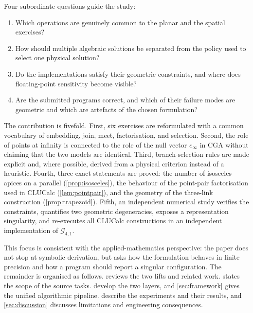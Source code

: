 \documentclass[11pt,a4paper]{article}
\theoremstyle{plain}
\theoremstyle{definition}
\theoremstyle{remark}
\newcommand{\GA}{\mathcal{G}_{4,1}}
\newcommand{\einf}{e_{\infty}}
\begin{document}
Four subordinate questions guide the study:
\begin{enumerate}[label=\textbf{RQ\arabic*.},leftmargin=3.2em]
  \item Which operations are genuinely common to the planar and the spatial
        exercises?
  \item How should multiple algebraic solutions be separated from the policy
        used to select one physical solution?
  \item Do the implementations satisfy their geometric constraints, and where
        does floating-point sensitivity become visible?
  \item Are the submitted programs correct, and which of their failure modes are
        geometric and which are artefacts of the chosen formulation?
\end{enumerate}

The contribution is fivefold. First, six exercises are reformulated with a
common vocabulary of embedding, join, meet, factorisation, and selection.
Second, the role of points at infinity is connected to the role of the null
vector $\einf$ in CGA without claiming that the two models are identical.
Third, branch-selection rules are made explicit and, where possible, derived
from a physical criterion instead of a heuristic. Fourth, three exact
statements are proved: the number of isosceles apices on a parallel
(\cref{prop:isosceles}), the behaviour of the point-pair factorisation used in
CLUCalc (\cref{lem:pointpair}), and the geometry of the three-link construction
(\cref{prop:trapezoid}). Fifth, an independent numerical study verifies the
constraints, quantifies two geometric degeneracies, exposes a representation
singularity, and re-executes all CLUCalc constructions in an independent
implementation of $\GA$.

This focus is consistent with the applied-mathematics perspective: the paper
does not stop at symbolic derivation, but asks how the formulation behaves in
finite precision and how a program should report a singular configuration. The
remainder is organised as follows.  reviews the two lifts
and related work.  states the scope of the source tasks.
 develop the two layers, and \cref{sec:framework}
gives the unified algorithmic pipeline. 
describe the experiments and their results, and \cref{sec:discussion}
discusses limitations and engineering consequences.

\end{document}
